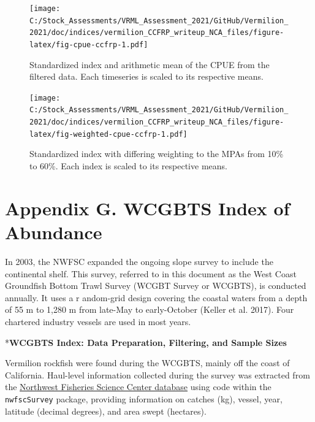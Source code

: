 \documentclass[11pt,
  english,
]{article}
\begin{document}
\begin{figure}
\centering
\texttt{[image: C:/Stock\_Assessments/VRML\_Assessment\_2021/GitHub/Vermilion\_2021/doc/indices/vermilion\_CCFRP\_writeup\_NCA\_files/figure-latex/fig-cpue-ccfrp-1.pdf]}
\caption{\label{fig:fig-cpue-ccfrp}Standardized index and arithmetic mean of the CPUE from the filtered data. Each timeseries is scaled to its respective means.}
\end{figure}

\begin{figure}
\centering
\texttt{[image: C:/Stock\_Assessments/VRML\_Assessment\_2021/GitHub/Vermilion\_2021/doc/indices/vermilion\_CCFRP\_writeup\_NCA\_files/figure-latex/fig-weighted-cpue-ccfrp-1.pdf]}
\caption{\label{fig:fig-weighted-cpue-ccfrp}Standardized index with differing weighting to the MPAs from 10\% to 60\%. Each index is scaled to its respective means.}
\end{figure}

\newpage


\hypertarget{appendix-g.-wcgbts-index-of-abundance}{%
\section*{Appendix G. WCGBTS Index of Abundance}\label{appendix-g.-wcgbts-index-of-abundance}}

\leavevmode\tagmcend\tagstructend

\renewcommand{\thepage}{G\arabic{page}}
\renewcommand{\thefigure}{G\arabic{figure}}
\renewcommand{\thetable}{G\arabic{table}}
\setcounter{page}{1}
\setcounter{figure}{0}
\setcounter{table}{0}

In 2003, the NWFSC expanded the ongoing slope survey to include the continental shelf. This survey, referred to in this document as the West Coast Groundfish Bottom Trawl Survey (WCGBT Survey or WCGBTS), is conducted annually. It uses a r andom-grid design covering the coastal waters from a depth of 55 m to 1,280 m from late-May to early-October {(Keller et al. 2017)\leavevmode\tagmcend\tagstructend}. Four chartered industry vessels are used in most years.

*\textbf{WCGBTS Index: Data Preparation, Filtering, and Sample Sizes}

Vermilion rockfish were found during the WCGBTS, mainly off the coast of California. Haul-level information collected during the survey was extracted from the {\href{https://www.webapps.nwfsc.noaa.gov/data}{Northwest Fisheries Science Center database}\leavevmode\tagmcend\tagstructend} using code within the \texttt{nwfscSurvey} package, providing information on catches (kg), vessel, year, latitude (decimal degrees), and area swept (hectares).
\end{document}
